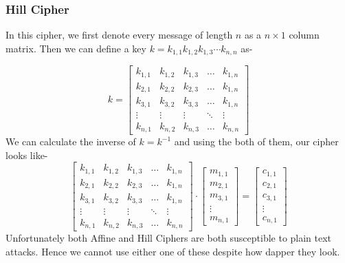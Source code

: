 			\subsubsection*{Hill Cipher}
				In this cipher, we first denote every message of length \(n\) as a \(n \times 1\) column matrix. Then we can define a key \(k= k_{1,1}k_{1,2}k_{1,3}\cdots k_{n,n}\) as- \par 
				\[
				k=
				\begin{bmatrix}
					k_{1,1} & k_{1,2} & k_{1,3} & \dots & k_{1,n}\\
					k_{2,1} & k_{2,2} & k_{2,3} & \dots & k_{1,n}\\
					k_{3,1} & k_{3,2} & k_{3,3} & \dots & k_{1,n}\\
					\vdots & \vdots & \vdots & \ddots & \vdots \\
					k_{n,1} & k_{n,2} & k_{n,3} & \dots & k_{n,n}
				\end{bmatrix}
				\]
				We can calculate the inverse of \(k= k^{-1}\) and using the both of them, our cipher looks like-
				\[
				\begin{bmatrix}
					k_{1,1} & k_{1,2} & k_{1,3} & \dots & k_{1,n}\\
					k_{2,1} & k_{2,2} & k_{2,3} & \dots & k_{1,n}\\
					k_{3,1} & k_{3,2} & k_{3,3} & \dots & k_{1,n}\\
					\vdots & \vdots & \vdots & \ddots & \vdots \\
					k_{n,1} & k_{n,2} & k_{n,3} & \dots & k_{n,n}
				\end{bmatrix}
				\cdot 
				\begin{bmatrix}
					m_{1,1}\\
					m_{2,1}\\
					m_{3,1}\\
					\vdots \\
					m_{n,1}
				\end{bmatrix}
				=
				\begin{bmatrix}
					c_{1,1}\\
					c_{2,1}\\
					c_{3,1}\\
					\vdots \\
					c_{n,1}
				\end{bmatrix}
				\]
				Unfortunately both Affine and Hill Ciphers are both susceptible to plain text attacks. Hence we cannot use either one of these despite how dapper they look.

